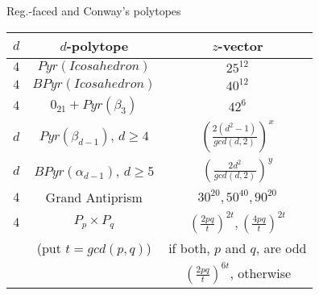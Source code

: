 \documentclass[%
pdf,
colorBG,
slideColor,
]{prosper}
\begin{document}
\begin{slide}{Reg.-faced and Conway's polytopes}


\begin{center}
{\scriptsize
\begin{tabular}{||c|c|c||}
\hline
$d$&$d$-polytope                        & $z$-vector\\
\hline
$4$&$Pyr(Icosahedron)$             &$25^{12}$\\
$4$&$BPyr(Icosahedron)$            &$40^{12}$\\
$4$&$0_{21}+Pyr(\beta_3)$          &$42^6$\\
$d$&$Pyr(\beta_{d-1})$, $d\geq 4$  &$(\frac{2(d^2-1)}{gcd(d,2)})^{x}$\\
$d$&$BPyr(\alpha_{d-1})$, $d\geq 5$&$(\frac{2d^2}{gcd(d,2)})^{y}$\\
\hline
$4$&Grand Antiprism                &$30^{20}, 50^{40}, 90^{20}$\\
$4$&$P_p\times P_q$                &$(\frac{2pq}{t})^{2t}, (\frac{4pq}{t})^{2t}$\\
&(put $t=gcd(p,q)$)                &if both, $p$ and $q$, are odd\\
&                                   &$(\frac{2pq}{t})^{6t}$, otherwise\\
\hline
\hline
\end{tabular}
}
\end{center}


\end{slide}
\end{document}
